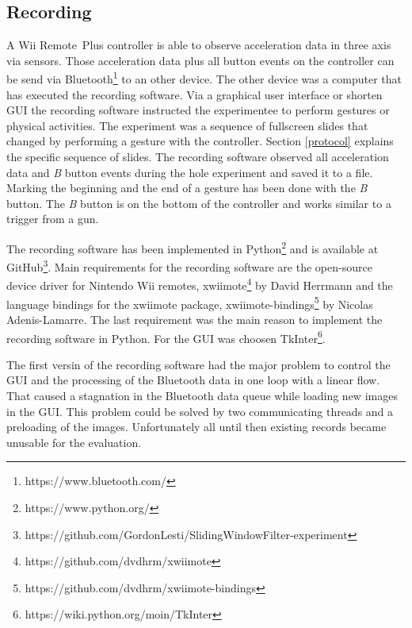 \subsection{Recording}
A Wii Remote\texttrademark~Plus controller is able to observe acceleration data in three axis via sensors. Those
acceleration data plus all button events on the controller can be send via
Bluetooth\footnote{https://www.bluetooth.com/} to an other device. The other device was a computer that has executed the
recording software. Via a graphical user interface or shorten GUI the recording software instructed the experimentee to
perform gestures or physical activities. The experiment was a sequence of fullscreen slides that changed by performing a
gesture with the controller. Section \ref{protocol} explains the specific sequence of slides. The recording software
observed all acceleration data and \textit{B} button events during the hole experiment and saved it to a file. Marking
the beginning and the end of a gesture has been done with the \textit{B} button. The \textit{B} button is on the bottom
of the controller and works similar to a trigger from a gun.

The recording software has been implemented in Python\footnote{https://www.python.org/} and is available at
GitHub\footnote{https://github.com/GordonLesti/SlidingWindowFilter-experiment}. Main requirements for the recording
software are the open-source device driver for Nintendo Wii remotes,
xwiimote\footnote{https://github.com/dvdhrm/xwiimote} by David Herrmann and the language bindings for the xwiimote
package, xwiimote-bindings\footnote{https://github.com/dvdhrm/xwiimote-bindings} by Nicolas Adenis-Lamarre. The last
requirement was the main reason to implement the recording software in Python. For the GUI was choosen
TkInter\footnote{https://wiki.python.org/moin/TkInter}.

The first versin of the recording software had the major problem to control the GUI and the
processing of the Bluetooth data in one loop with a linear flow. That caused a stagnation in the Bluetooth data queue
while loading new images in the GUI. This problem could be solved by two communicating threads and a preloading of the
images. Unfortunately all until then existing records became unusable for the evaluation.


